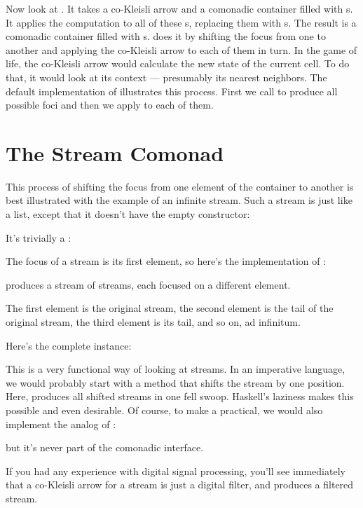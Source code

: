 Now look at . It takes a co-Kleisli arrow and a comonadic
container  filled with s. It applies the
computation to all of these s, replacing them with
s. The result is a comonadic container filled with
s.  does it by shifting the focus from one
 to another and applying the co-Kleisli arrow to each of them
in turn. In the game of life, the co-Kleisli arrow would calculate the
new state of the current cell. To do that, it would look at its context
--- presumably its nearest neighbors. The default implementation of
 illustrates this process. First we call
 to produce all possible foci and then we apply
 to each of them.

\section{The Stream Comonad}

This process of shifting the focus from one element of the container to
another is best illustrated with the example of an infinite stream. Such
a stream is just like a list, except that it doesn't have the empty
constructor:

It's trivially a :

The focus of a stream is its first element, so here's the implementation
of :

 produces a stream of streams, each focused on a
different element.

The first element is the original stream, the second element is the tail
of the original stream, the third element is its tail, and so on, ad
infinitum.

Here's the complete instance:

This is a very functional way of looking at streams. In an imperative
language, we would probably start with a method  that
shifts the stream by one position. Here,  produces all
shifted streams in one fell swoop. Haskell's laziness makes this
possible and even desirable. Of course, to make a 
practical, we would also implement the analog of :

but it's never part of the comonadic interface.

If you had any experience with digital signal processing, you'll see
immediately that a co-Kleisli arrow for a stream is just a digital
filter, and  produces a filtered stream.

